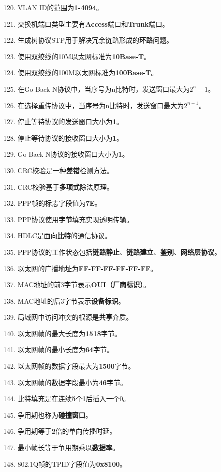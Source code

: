 \documentclass[12pt,a4paper,openany]{ctexbook}
\begin{document}
120. VLAN ID的范围为\textbf{1-4094}。

121. 交换机端口类型主要有\textbf{Access}端口和\textbf{Trunk}端口。

122. 生成树协议STP用于解决冗余链路形成的\textbf{环路}问题。

123. 使用双绞线的10M以太网标准为\textbf{10Base-T}。

124. 使用双绞线的100M以太网标准为\textbf{100Base-T}。

125. 在Go-Back-N协议中，当序号为n比特时，发送窗口最大为\textbf{$2^n-1$}。

126. 在选择重传协议中，当序号为n比特时，发送窗口最大为\textbf{$2^{n-1}$}。

127. 停止等待协议的发送窗口大小为\textbf{1}。

128. 停止等待协议的接收窗口大小为\textbf{1}。

129. Go-Back-N协议的接收窗口大小为\textbf{1}。

130. CRC校验是一种\textbf{差错}检测方法。

131. CRC校验基于\textbf{多项式}除法原理。

132. PPP帧的标志字段值为\textbf{7E}。

133. PPP协议使用\textbf{字节}填充实现透明传输。

134. HDLC是面向\textbf{比特}的通信协议。

135. PPP协议的工作状态包括\textbf{链路静止}、\textbf{链路建立}、\textbf{鉴别}、\textbf{网络层协议}。

136. 以太网的广播地址为\textbf{FF-FF-FF-FF-FF-FF}。

137. MAC地址的前3字节表示\textbf{OUI（厂商标识）}。

138. MAC地址的后3字节表示\textbf{设备标识}。

139. 局域网中访问冲突的根源是\textbf{共享}介质。

140. 以太网帧的最大长度为\textbf{1518}字节。

141. 以太网帧的最小长度为\textbf{64}字节。

142. 以太网帧的数据字段最大为\textbf{1500}字节。

143. 以太网帧的数据字段最小为\textbf{46}字节。

144. 比特填充是在连续\textbf{5}个1后插入一个0。

145. 争用期也称为\textbf{碰撞窗口}。

146. 争用期等于\textbf{2}倍的单向传播时延。

147. 最小帧长等于争用期乘以\textbf{数据率}。

148. 802.1Q帧的TPID字段值为\textbf{0x8100}。
\end{document}
